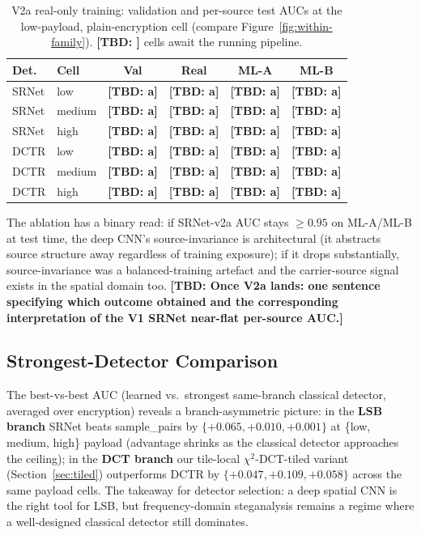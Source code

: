 \documentclass[10pt,twocolumn,a4paper]{article}
\newcommand{\TBD}[1]{\textbf{\color{red}[TBD: #1]}}
\begin{document}
\begin{table}[!htbp]
\centering\footnotesize
\caption{V2a real-only training: validation and per-source test AUCs at the low-payload, plain-encryption cell (compare Figure~\ref{fig:within-family}). \protect\TBD{} cells await the running pipeline.}
\label{tab:v2a-results}
\setlength{\tabcolsep}{4pt}\renewcommand{\arraystretch}{1.05}
\begin{tabular}{@{}llcccc@{}}
\toprule
\textbf{Det.} & \textbf{Cell} & \textbf{Val} & \textbf{Real} & \textbf{ML-A} & \textbf{ML-B} \\
\midrule
SRNet & low    & \TBD{a} & \TBD{a} & \TBD{a} & \TBD{a} \\
SRNet & medium & \TBD{a} & \TBD{a} & \TBD{a} & \TBD{a} \\
SRNet & high   & \TBD{a} & \TBD{a} & \TBD{a} & \TBD{a} \\
DCTR  & low    & \TBD{a} & \TBD{a} & \TBD{a} & \TBD{a} \\
DCTR  & medium & \TBD{a} & \TBD{a} & \TBD{a} & \TBD{a} \\
DCTR  & high   & \TBD{a} & \TBD{a} & \TBD{a} & \TBD{a} \\
\bottomrule
\end{tabular}
\end{table}

The ablation has a binary read: if SRNet-v2a AUC stays $\geq 0.95$ on ML-A/ML-B at test time, the deep CNN's source-invariance is architectural (it abstracts source structure away regardless of training exposure); if it drops substantially, source-invariance was a balanced-training artefact and the carrier-source signal exists in the spatial domain too. \TBD{Once V2a lands: one sentence specifying which outcome obtained and the corresponding interpretation of the V1 SRNet near-flat per-source AUC.}

\subsection{Strongest-Detector Comparison}

The best-vs-best AUC (learned vs.\ strongest same-branch classical detector, averaged over encryption) reveals a branch-asymmetric picture: in the \textbf{LSB branch} SRNet beats sample\_pairs by $\{+0.065, +0.010, +0.001\}$ at \{low, medium, high\} payload (advantage shrinks as the classical detector approaches the ceiling); in the \textbf{DCT branch} our tile-local $\chi^2$-DCT-tiled variant (Section~\ref{sec:tiled}) outperforms DCTR by $\{+0.047, +0.109, +0.058\}$ across the same payload cells. The takeaway for detector selection: a deep spatial CNN is the right tool for LSB, but frequency-domain steganalysis remains a regime where a well-designed classical detector still dominates.
\end{document}
